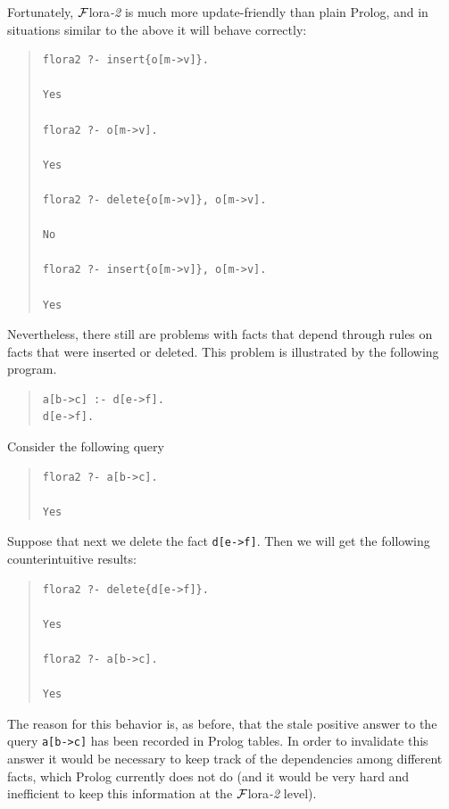 \documentclass[11pt]{article}
\newcommand{\FLORA}{{\mbox{\sc ${\cal F}${lora}\rm\emph{-2}}}\xspace}
\begin{document}
Fortunately, \FLORA is much more update-friendly than plain Prolog, and in
situations similar to the above it will behave correctly:
\begin{quote}
\begin{verbatim}
flora2 ?- insert{o[m->v]}.

Yes

flora2 ?- o[m->v].

Yes

flora2 ?- delete{o[m->v]}, o[m->v].

No

flora2 ?- insert{o[m->v]}, o[m->v].

Yes
\end{verbatim}
\end{quote}
Nevertheless, there still are problems with facts that
depend through rules on facts that were inserted or deleted.  This
problem is illustrated by the following program.
\begin{quote}
\begin{verbatim}
a[b->c] :- d[e->f].  
d[e->f].
\end{verbatim}
\end{quote}
Consider the following query
\begin{quote}
\begin{verbatim}
flora2 ?- a[b->c].

Yes
\end{verbatim}
\end{quote}
Suppose that next we delete the fact {\tt d[e->f]}. Then we will get the
following counterintuitive results:
\begin{quote}
\begin{verbatim}
flora2 ?- delete{d[e->f]}.

Yes

flora2 ?- a[b->c].

Yes
\end{verbatim}
\end{quote}
The reason for this behavior is, as before, that the stale positive
answer to the query {\tt a[b->c]} has been recorded in Prolog tables.
In order to invalidate this answer it would be necessary to keep 
track of the dependencies among different facts, which Prolog currently
does not do (and it would be very hard and inefficient to keep this
information at the \FLORA level).
\end{document}
